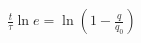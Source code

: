 \documentclass[preview]{standalone}
\begin{document}
\begin{align*}
\frac{t}{\tau}\ln e=\ln\left( 1-\frac{q}{q_{0}} \right)
\end{align*}
\end{document}
